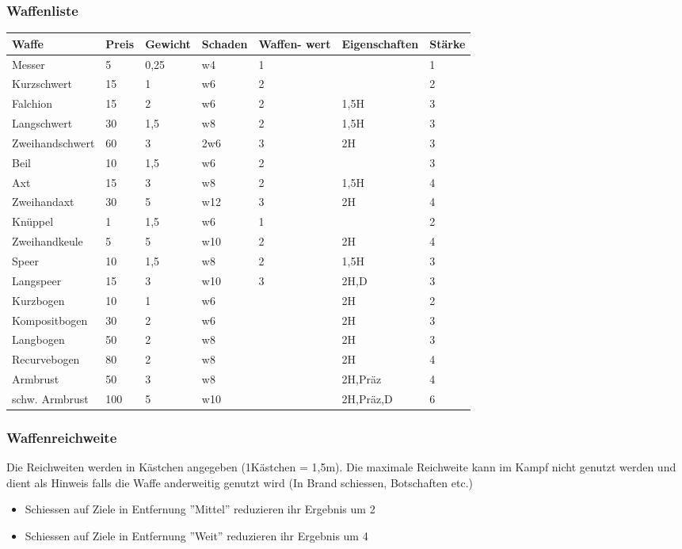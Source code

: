 \documentclass{article}
\begin{document}
\subsubsection{Waffenliste}


\begin{small}
\begin{tabular}{|m{25mm}|m{1cm}|m{15mm}|m{15mm}|m{15mm}|m{25mm}|m{1cm}|}
\hline
\textbf{Waffe}&\textbf{Preis}&\textbf{Gewicht}&\textbf{Schaden}&\textbf{Waffen- wert}&\textbf{Eigenschaften}&\textbf{Stärke}\\
\hline
\hline
Messer&5&0,25&w4&1&&1\\
\hline
Kurzschwert&15&1&w6&2&&2\\
\hline
Falchion&15&2&w6&2&1,5H&3\\
\hline
Langschwert&30&1,5&w8&2&1,5H&3\\
\hline
Zweihandschwert&60&3&2w6&3&2H&3\\
\hline
Beil&10&1,5&w6&2&&3\\
\hline
Axt&15&3&w8&2&1,5H&4\\
\hline
Zweihandaxt&30&5&w12&3&2H&4\\
\hline
Knüppel&1&1,5&w6&1&&2\\
\hline
Zweihandkeule&5&5&w10&2&2H&4\\
\hline
Speer&10&1,5&w8&2&1,5H&3\\
\hline
Langspeer&15&3&w10&3&2H,D&3\\
\hline
Kurzbogen&10&1&w6&&2H&2\\
\hline
Kompositbogen&30&2&w6&&2H&3\\
\hline
Langbogen&50&2&w8&&2H&3\\
\hline
Recurvebogen&80&2&w8&&2H&4\\
\hline
Armbrust&50&3&w8&&2H,Präz&4\\
\hline
schw. Armbrust&100&5&w10&&2H,Präz,D&6\\
\hline
\end{tabular}
\end{small}

\subsubsection{Waffenreichweite}

Die Reichweiten werden in Kästchen angegeben (1Kästchen = 1,5m). Die maximale Reichweite kann im Kampf nicht genutzt
werden und dient als Hinweis falls die Waffe anderweitig genutzt wird (In Brand schiessen, Botschaften etc.)

\begin{itemize}
\item Schiessen auf Ziele in Entfernung ''Mittel'' reduzieren ihr Ergebnis um 2
\item Schiessen auf Ziele in Entfernung ''Weit'' reduzieren ihr Ergebnis um 4
\end{itemize}
\end{document}

